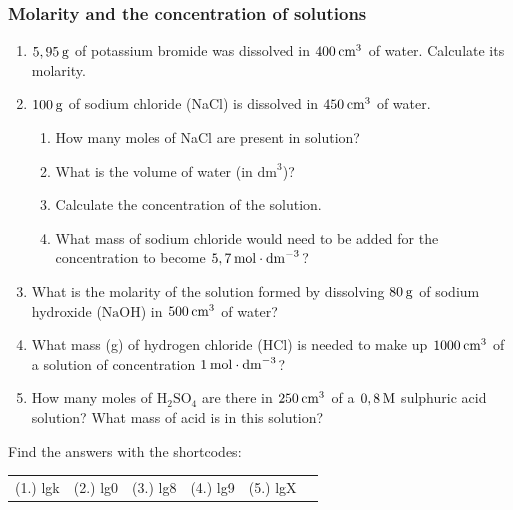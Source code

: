             \subsubsection{  Molarity and the concentration of solutions
      }
            \nopagebreak
      \label{m38712*id283713}\begin{enumerate}[noitemsep, label=\textbf{\arabic*}. ] 
            \label{m38712*uid92}\item $5,95\phantom{\rule{2pt}{0ex}}\mathrm{g}$ of potassium bromide was dissolved in $400\phantom{\rule{2pt}{0ex}}{\mathrm{cm}}^{3}$ of water. Calculate its molarity.\newline
\label{m38712*uid93}\item $100\phantom{\rule{2pt}{0ex}}\mathrm{g}$ of sodium chloride (NaCl) is dissolved in $450\phantom{\rule{2pt}{0ex}}{\mathrm{cm}}^{3}$ of water.
\label{m38712*id283768}\begin{enumerate}[noitemsep, label=\textbf{\alph*}. ] 
            \label{m38712*uid94}\item How many moles of NaCl are present in solution?
\label{m38712*uid95}\item What is the volume of water (in ${\mathrm{dm}}^{3}$)?
\label{m38712*uid96}\item Calculate the concentration of the solution.
\label{m38712*uid97}\item What mass of sodium chloride would need to be added for the concentration to become $5,7\phantom{\rule{2pt}{0ex}}\mathrm{mol}\ensuremath{\cdot}{\mathrm{dm}}^{-3}$?
\end{enumerate}
                \label{m38712*uid98}\item What is the molarity of the solution formed by dissolving $80\phantom{\rule{2pt}{0ex}}\mathrm{g}$ of sodium hydroxide ($\mathrm{NaOH}$) in $500\phantom{\rule{2pt}{0ex}}{\mathrm{cm}}^{3}$ of water?\newline
\label{m38712*uid99}\item What mass (g) of hydrogen chloride ($\mathrm{HCl}$) is needed to make up $1000\phantom{\rule{2pt}{0ex}}{\mathrm{cm}}^{3}$ of a solution of concentration $1\phantom{\rule{2pt}{0ex}}\mathrm{mol}\ensuremath{\cdot}{\mathrm{dm}}^{-3}$?\newline
\label{m38712*uid100}\item How many moles of $\mathrm{H}{}_{2}\mathrm{SO}{}_{4}$ are there in $250\phantom{\rule{2pt}{0ex}}{\mathrm{cm}}^{3}$ of a $0,8\phantom{\rule{2pt}{0ex}}\mathrm{M}$ sulphuric acid solution? What mass of acid is in this solution?\newline
\end{enumerate}
    \label{m38712*cid9}
\par {} Find the answers with the shortcodes:
 \par \begin{tabular}[h]{cccccc}
 (1.) lgk  &  (2.) lg0  &  (3.) lg8  &  (4.) lg9  &  (5.) lgX  & \end{tabular}
